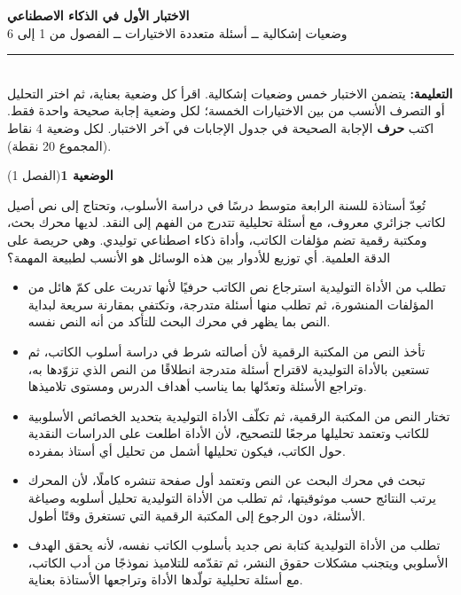 \documentclass[11pt,a4paper]{article}
\begin{document}
\linespread{1.08}\selectfont
\begin{center}
{\LARGE\khatt\textbf{الاختبار الأول في الذكاء الاصطناعي}}\\[4pt]
{\normalsize وضعيات إشكالية ــ أسئلة متعددة الاختيارات ــ الفصول من 1 إلى 6}
\end{center}
\vspace{-2pt}\rule{\textwidth}{0.6pt}\\[2pt]
\textbf{التعليمة:} يتضمن الاختبار خمس وضعيات إشكالية. اقرأ كل وضعية بعناية، ثم اختر التحليل أو التصرف الأنسب
من بين الاختيارات الخمسة؛ لكل وضعية إجابة صحيحة واحدة فقط.
اكتب \textbf{حرف} الإجابة الصحيحة في جدول الإجابات في آخر الاختبار.
لكل وضعية 4 نقاط (المجموع 20 نقطة).
\vspace{4pt}

\noindent
{\large\khatt\textbf{الوضعية 1}}\hfill{\small(الفصل 1)}\par\nopagebreak\vspace{3pt}
\setlength{\fboxsep}{7pt}\colorbox{gray!10}{\parbox{\dimexpr\linewidth-14pt}{تُعِدّ أستاذة للسنة الرابعة متوسط درسًا في دراسة الأسلوب، وتحتاج إلى نص أصيل لكاتب جزائري معروف، مع أسئلة تحليلية تتدرج من الفهم إلى النقد. لديها محرك بحث، ومكتبة رقمية تضم مؤلفات الكاتب، وأداة ذكاء اصطناعي توليدي. وهي حريصة على الدقة العلمية. أي توزيع للأدوار بين هذه الوسائل هو الأنسب لطبيعة المهمة؟}}\par\nopagebreak
\begin{itemize}[leftmargin=1.0cm, labelsep=6pt, itemsep=3pt, topsep=4pt, parsep=0pt]
  \item[\textbf{أ)}] تطلب من الأداة التوليدية استرجاع نص الكاتب حرفيًا لأنها تدربت على كمّ هائل من المؤلفات المنشورة، ثم تطلب منها أسئلة متدرجة، وتكتفي بمقارنة سريعة لبداية النص بما يظهر في محرك البحث للتأكد من أنه النص نفسه.
  \item[\textbf{ب)}] تأخذ النص من المكتبة الرقمية لأن أصالته شرط في دراسة أسلوب الكاتب، ثم تستعين بالأداة التوليدية لاقتراح أسئلة متدرجة انطلاقًا من النص الذي تزوّدها به، وتراجع الأسئلة وتعدّلها بما يناسب أهداف الدرس ومستوى تلاميذها.
  \item[\textbf{ج)}] تختار النص من المكتبة الرقمية، ثم تكلّف الأداة التوليدية بتحديد الخصائص الأسلوبية للكاتب وتعتمد تحليلها مرجعًا للتصحيح، لأن الأداة اطلعت على الدراسات النقدية حول الكاتب، فيكون تحليلها أشمل من تحليل أي أستاذ بمفرده.
  \item[\textbf{د)}] تبحث في محرك البحث عن النص وتعتمد أول صفحة تنشره كاملًا، لأن المحرك يرتب النتائج حسب موثوقيتها، ثم تطلب من الأداة التوليدية تحليل أسلوبه وصياغة الأسئلة، دون الرجوع إلى المكتبة الرقمية التي تستغرق وقتًا أطول.
  \item[\textbf{هـ)}] تطلب من الأداة التوليدية كتابة نص جديد بأسلوب الكاتب نفسه، لأنه يحقق الهدف الأسلوبي ويتجنب مشكلات حقوق النشر، ثم تقدّمه للتلاميذ نموذجًا من أدب الكاتب، مع أسئلة تحليلية تولّدها الأداة وتراجعها الأستاذة بعناية.
\end{itemize}
\end{document}
